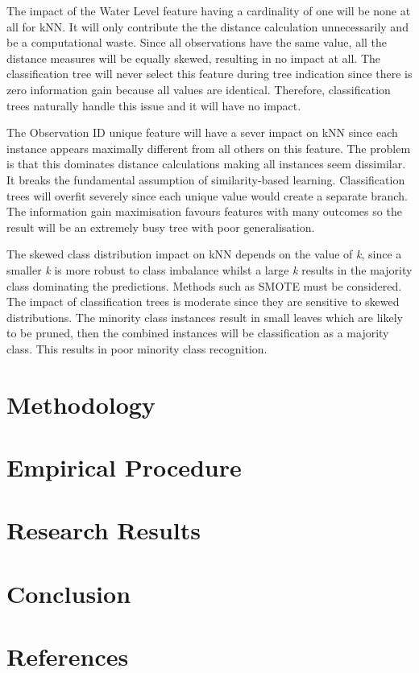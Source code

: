\documentclass[conference]{IEEEtran}
\begin{document}
The impact of the Water Level feature having a cardinality of one will be none at all for kNN. It will only contribute the the distance calculation unnecessarily and be a computational waste. Since all observations have the same value, all the distance measures will be equally skewed, resulting in no impact at all. The classification tree will never select this feature during tree indication since there is zero information gain because all values are identical. Therefore, classification trees naturally handle this issue and it will have no impact.

The Observation ID unique feature will have a sever impact on kNN since each instance appears maximally different from all others on this feature. The problem is that this dominates distance calculations making all instances seem dissimilar. It breaks the fundamental assumption of similarity-based learning. Classification trees will overfit severely since each unique value would create a separate branch. The information gain maximisation favours features with many outcomes so the result will be an extremely busy tree with poor generalisation.

The skewed class distribution impact on kNN depends on the value of \textit{k}, since a smaller \textit{k} is more robust to class imbalance whilst a large \textit{k} results in the majority class dominating the predictions. Methods such as SMOTE must be considered. The impact of classification trees is moderate since they are sensitive to skewed distributions. The minority class instances result in small leaves which are likely to be pruned, then the combined instances will be classification as a majority class. This results in poor minority class recognition.

\section{Methodology}
\section{Empirical Procedure}
\section{Research Results}
\section{Conclusion}
\section*{References}
\end{document}
